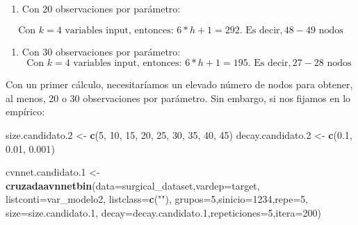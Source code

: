 \documentclass[
]{article}
\newenvironment{Shaded}{\begin{snugshade}}{\end{snugshade}}
\newcommand{\DataTypeTok}[1]{\textcolor[rgb]{0.13,0.29,0.53}{#1}}
\newcommand{\DecValTok}[1]{\textcolor[rgb]{0.00,0.00,0.81}{#1}}
\newcommand{\FloatTok}[1]{\textcolor[rgb]{0.00,0.00,0.81}{#1}}
\newcommand{\KeywordTok}[1]{\textcolor[rgb]{0.13,0.29,0.53}{\textbf{#1}}}
\newcommand{\NormalTok}[1]{#1}
\newcommand{\StringTok}[1]{\textcolor[rgb]{0.31,0.60,0.02}{#1}}
\providecommand{\tightlist}{%
  \setlength{\itemsep}{0pt}\setlength{\parskip}{0pt}}
\begin{document}
\begin{enumerate}
\def\labelenumi{\arabic{enumi}.}
\tightlist
\item
  Con 20 observaciones por parámetro:
\end{enumerate}

\[
\text{Con } k = 4 \text{ variables input, entonces: } 6 * h + 1 = 292. \text{ Es decir}, 48-49 \text{ nodos}
\]

\begin{enumerate}
\def\labelenumi{\arabic{enumi}.}
\setcounter{enumi}{1}
\tightlist
\item
  Con 30 observaciones por parámetro: \[
  \text{Con } k = 4 \text{ variables input, entonces: } 6 * h + 1 = 195 \text{. Es decir}, 27-28 \text{ nodos}
  \]
\end{enumerate}

Con un primer cálculo, necesitaríamos un elevado número de nodos para
obtener, al menos, 20 o 30 observaciones por parámetro. Sin embargo, si
nos fijamos en lo empírico:

\begin{Shaded}
\begin{Highlighting}[]
\NormalTok{size.candidato}\FloatTok{.2}\NormalTok{ <{-}}\StringTok{ }\KeywordTok{c}\NormalTok{(}\DecValTok{5}\NormalTok{, }\DecValTok{10}\NormalTok{, }\DecValTok{15}\NormalTok{, }\DecValTok{20}\NormalTok{, }\DecValTok{25}\NormalTok{, }\DecValTok{30}\NormalTok{, }\DecValTok{35}\NormalTok{, }\DecValTok{40}\NormalTok{, }\DecValTok{45}\NormalTok{)}
\NormalTok{decay.candidato}\FloatTok{.2}\NormalTok{ <{-}}\StringTok{ }\KeywordTok{c}\NormalTok{(}\FloatTok{0.1}\NormalTok{, }\FloatTok{0.01}\NormalTok{, }\FloatTok{0.001}\NormalTok{)}

\NormalTok{cvnnet.candidato}\FloatTok{.1}\NormalTok{ <{-}}\StringTok{ }\KeywordTok{cruzadaavnnetbin}\NormalTok{(}\DataTypeTok{data=}\NormalTok{surgical\_dataset,}\DataTypeTok{vardep=}\NormalTok{target,}
                                       \DataTypeTok{listconti=}\NormalTok{var\_modelo2, }\DataTypeTok{listclass=}\KeywordTok{c}\NormalTok{(}\StringTok{""}\NormalTok{),}
                                       \DataTypeTok{grupos=}\DecValTok{5}\NormalTok{,}\DataTypeTok{sinicio=}\DecValTok{1234}\NormalTok{,}\DataTypeTok{repe=}\DecValTok{5}\NormalTok{, }\DataTypeTok{size=}\NormalTok{size.candidato}\FloatTok{.1}\NormalTok{,}
                                       \DataTypeTok{decay=}\NormalTok{decay.candidato}\FloatTok{.1}\NormalTok{,}\DataTypeTok{repeticiones=}\DecValTok{5}\NormalTok{,}\DataTypeTok{itera=}\DecValTok{200}\NormalTok{)}
\end{Highlighting}
\end{Shaded}
\end{document}

